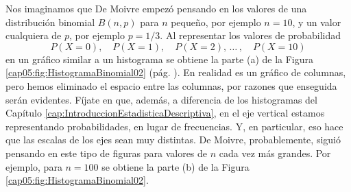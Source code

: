 Nos imaginamos que De Moivre empezó pensando en los valores de una distribución binomial $B(n,p)$ para $n$ pequeño, por ejemplo $n=10$, y un valor cualquiera de $p$, por ejemplo $p=1/3$.
Al representar los valores de probabilidad
\[P(X=0),\quad P(X=1),\quad P(X=2),\,\ldots\,,\quad P(X=10)\]
en un gráfico similar a un histograma se obtiene la parte (a) de la Figura \ref{cap05:fig:HistogramaBinomial02} (pág. \pageref{cap05:fig:HistogramaBinomial02}). En realidad es un gráfico de columnas, pero hemos eliminado el espacio entre las columnas, por razones que enseguida serán evidentes. Fíjate en que, además, a diferencia de los histogramas del Capítulo \ref{cap:IntroduccionEstadisticaDescriptiva}, en el eje vertical estamos representando probabilidades, en lugar de frecuencias. Y, en particular, eso hace que las escalas de los ejes sean muy distintas. De Moivre, probablemente, siguió pensando en este tipo de figuras para valores de $n$ cada vez más grandes. Por ejemplo, para $n=100$ se obtiene la parte (b) de la Figura \ref{cap05:fig:HistogramaBinomial02}.

